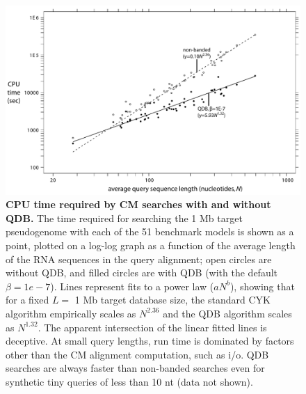 \begin{figure}
\begin{center}
\includegraphics[width=6.4in]{figs/speedup}
\caption{\textbf{CPU time required by CM searches with and without
    QDB.} The time required for searching the 1 Mb target pseudogenome
    with each of the 51 benchmark models is shown as a point, plotted
    on a log-log graph as a function of the average length of the RNA
    sequences in the query alignment; open circles are without QDB,
    and filled circles are with QDB (with the default $\beta =
    1e-7$). Lines represent fits to a power law ($aN^b$), showing that
    for a fixed $L=$ 1 Mb target database size, the standard CYK
    algorithm empirically scales as $N^{2.36}$ and the QDB algorithm
    scales as $N^{1.32}$. The apparent intersection of the linear
    fitted lines is deceptive. At small query lengths,
    run time is dominated by factors other than the CM alignment
    computation, such as i/o. QDB searches are always faster
    than non-banded searches even for synthetic tiny
    queries of less than 10 nt (data not shown).}
\label{fig:speedup}
\end{center}
\end{figure}


